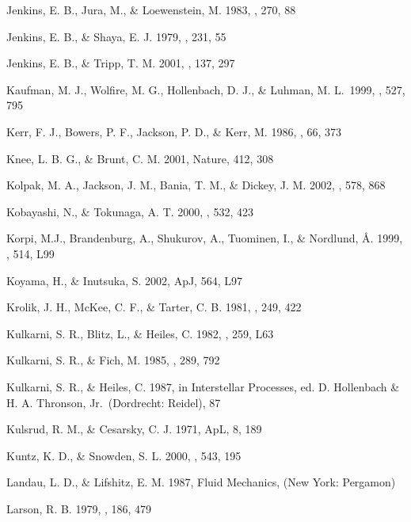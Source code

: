 \documentclass[12pt,preprint,flushrt]{aastex}
\begin{document}
\begin{thebibliography}{}
Jenkins, E. B., Jura, M.,
\& Loewenstein, M. 1983, \apj, 270, 88

Jenkins, E. B., \& Shaya, E. J.
1979, \apj, 231, 55

Jenkins, E. B., \&
Tripp, T. M. 2001, \apjs, 137, 297

Kaufman, M. J., Wolfire, M. G.,
Hollenbach, D. J., \& Luhman, M. L.\ 1999, \apj, 527, 795

Kerr, F. J., Bowers, P. F.,
Jackson, P. D., \& Kerr, M. 1986, \aaps, 66, 373

Knee, L. B. G., \& Brunt, C. M. 2001,
Nature, 412, 308
 
Kolpak, M. A.,
Jackson, J. M., Bania, T. M., \& Dickey, J. M. 2002, \apj, 578, 868

Kobayashi, N., \& Tokunaga,
A. T.  2000, \apj, 532, 423

Korpi, M.J., Brandenburg, A., Shukurov, A., Tuominen, I.,
\& Nordlund, \AA.  1999, \apj, 514, L99

Koyama, H., \& Inutsuka, S. 2002, ApJ, 564, L97

Krolik, J. H., McKee, C. F., \& Tarter, C. B. 1981, \apj, 249, 422

Kulkarni, S. R., Blitz, L., \& Heiles, C. 1982, \apj, 259, L63

Kulkarni, S. R., \& Fich, M. 1985, \apj, 289, 792

Kulkarni, S. R., \& Heiles, C. 1987,
in Interstellar Processes, ed. D. Hollenbach \& H. A. Thronson, Jr.\
(Dordrecht: Reidel), 87

Kulsrud, R. M.,
 \& Cesarsky, C. J. 1971, ApL, 8, 189

Kuntz, K. D., \& Snowden, S. L.
2000, \apj, 543, 195

Landau, L. D., \& Lifshitz, E. M.
     1987, Fluid Mechanics, (New York: Pergamon)
 
Larson, R. B. 1979, \mnras, 186, 479


\end{thebibliography}
\end{document}
